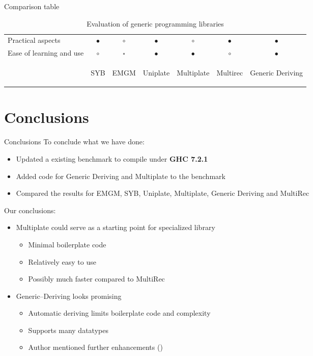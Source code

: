 \documentclass[10pt]{beamer}
\newcommand{\sufficient}{\tiny{$ \square $}}
\begin{document}
\begin{frame}{Comparison table}
\begin{table}[ht]
\begin{tabular}{l | c c c c c c}
Practical aspects & $ \bullet $ & $ \circ $ & $ \bullet $ & $ \circ $ & $ \bullet $ & $ \bullet $ \\
Ease of learning and use & $ \circ $ & \sufficient & $ \bullet $ & $ \bullet $ & $ \circ $ & $ \bullet $ \\
\hline
& \begin{tiny}
SYB
\end{tiny} & \begin{tiny}
EMGM
\end{tiny} & \begin{tiny}
Uniplate
\end{tiny} & \begin{tiny}
Multiplate
\end{tiny} & \begin{tiny}
Multirec
\end{tiny} & \begin{tiny}
Generic Deriving
\end{tiny} \\
\end{tabular}
	\caption{Evaluation of generic programming libraries}
\end{table}

\end{frame}

\section{Conclusions}
\begin{frame}{Conclusions}
To conclude what we have done:
\begin{itemize}
	\item Updated a existing benchmark to compile under \textbf{GHC 7.2.1}
	\item Added code for Generic Deriving and Multiplate to the benchmark
	\item Compared the results for EMGM, SYB, Uniplate, Multiplate, Generic Deriving and MultiRec
\end{itemize}

Our conclusions:
\begin{itemize}
	\item Multiplate could serve as a starting point for specialized library
	\begin{itemize}
	\item Minimal boilerplate code
	\item Relatively easy to use
	\item Possibly much faster compared to MultiRec
	\end{itemize}
	\item Generic--Deriving looks promising
	\begin{itemize}
	\item Automatic deriving limits boilerplate code and complexity
	\item Supports many datatypes
	\item Author mentioned further enhancements (\citet{generic-deriving:2010:lib})
	\end{itemize}
\end{itemize}
\end{frame}
\end{document}
